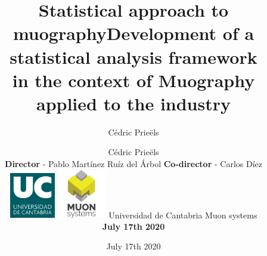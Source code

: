 \documentclass[8 pt]{beamer}
\title{Statistical approach to muography}
\date{July 17th 2020}
\author{C\'{e}dric Prie\"els}
\begin{document}
\begin{frame}
\vspace{-15pt} 
\title{Development of a statistical analysis framework \\ in the context of Muography applied to the industry}
\author{C\'{e}dric Prie\"els \\ \vspace{10pt} \textbf{Director} - Pablo Mart\'inez Ru\'iz del \'Arbol \newline \textbf{Co-director} - Carlos D\'iez \\ \vspace{20pt} \includegraphics[width= 0.15\textwidth]{figs/image_UC.png} \hspace{10pt} \includegraphics[width= 0.16\textwidth]{figs/muonSystems.png} \newline \vspace{20pt} Universidad de Cantabria \newline Muon systems \newline  \begin{center} \large{\textbf{July 17th 2020}} \end{center}}

\date{}
\vspace{15pt}
\maketitle

\centering
  
\end{frame}
\end{document}
